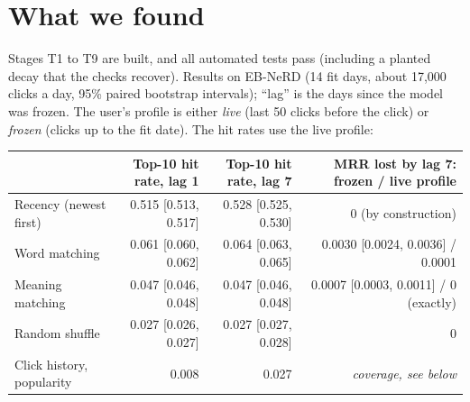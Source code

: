 \documentclass[10pt,a4paper]{article}
\begin{document}
\section{What we found}
Stages T1 to T9 are built, and all automated tests pass (including a planted decay that the checks recover). Results on EB-NeRD (14 fit days, about 17,000 clicks a day, 95\% paired bootstrap intervals); ``lag'' is the days since the model was frozen. The user's profile is either \emph{live} (last 50 clicks before the click) or \emph{frozen} (clicks up to the fit date). The hit rates use the live profile:
\begin{center}
\small
\setlength{\tabcolsep}{4pt}
\begin{tabular}{@{}lrrr@{}}
\toprule
 & Top-10 hit rate, lag 1 & Top-10 hit rate, lag 7 & MRR lost by lag 7: frozen / live profile\\
\midrule
Recency (newest first) & 0.515 [0.513, 0.517] & 0.528 [0.525, 0.530] & 0 (by construction)\\
Word matching & 0.061 [0.060, 0.062] & 0.064 [0.063, 0.065] & 0.0030 [0.0024, 0.0036] / 0.0001\\
Meaning matching & 0.047 [0.046, 0.048] & 0.047 [0.046, 0.048] & 0.0007 [0.0003, 0.0011] / 0 (exactly)\\
Random shuffle & 0.027 [0.026, 0.027] & 0.027 [0.027, 0.028] & 0\\
Click history, popularity & 0.008 & 0.027 & \emph{coverage, see below}\\
\bottomrule
\end{tabular}
\end{center}
\end{document}
